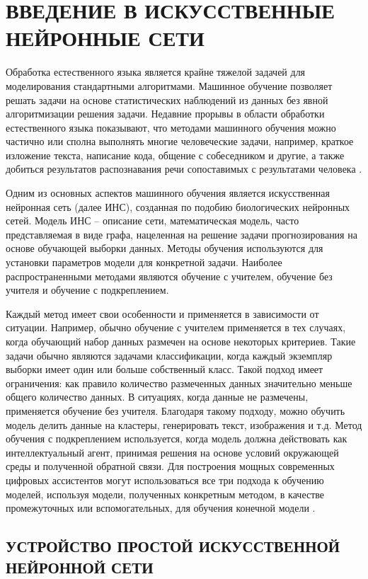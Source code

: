 \section{ВВЕДЕНИЕ В ИСКУССТВЕННЫЕ НЕЙРОННЫЕ СЕТИ}
Обработка естественного языка является крайне тяжелой задачей для моделирования стандартными алгоритмами. Машинное обучение позволяет решать задачи на основе статистических наблюдений из данных без явной алгоритмизации решения задачи. Недавние прорывы в области обработки естественного языка показывают, что методами машинного обучения можно частично или сполна выполнять многие человеческие задачи, например, краткое изложение текста, написание кода, общение с собеседником и другие, а также добиться результатов распознавания речи сопоставимых с результатами человека \cite{human-wer,whisper}.

Одним из основных аспектов машинного обучения является искусственная нейронная сеть (далее ИНС), созданная по подобию биологических нейронных сетей. Модель ИНС -- описание сети, математическая модель, часто представляемая в виде графа, нацеленная на решение задачи прогнозирования на основе обучающей выборки данных. Методы обучения используются для установки параметров модели для конкретной задачи. Наиболее распространенными методами являются обучение с учителем, обучение без учителя и обучение с подкреплением.

Каждый метод имеет свои особенности и применяется в зависимости от ситуации. Например, обычно обучение с учителем применяется в тех случаях, когда обучающий набор данных размечен на основе некоторых критериев. Такие задачи обычно являются задачами классификации, когда каждый экземпляр выборки имеет один или больше собственный класс. Такой подход имеет ограничения: как правило количество размеченных данных значительно меньше общего количество данных. В ситуациях, когда данные не размечены, применяется обучение без учителя. Благодаря такому подходу, можно обучить модель делить данные на кластеры, генерировать текст, изображения и т.д. Метод обучения с подкреплением используется, когда модель должна действовать как интеллектуальный агент, принимая решения на основе условий окружающей среды и полученной обратной связи. Для построения мощных современных цифровых ассистентов могут использоваться все три подхода к обучению моделей, используя модели, полученных конкретным методом, в качестве промежуточных или вспомогательных, для обучения конечной модели \cite{state-of-gpt}.

\subsection{УСТРОЙСТВО ПРОСТОЙ ИСКУССТВЕННОЙ НЕЙРОННОЙ СЕТИ}

